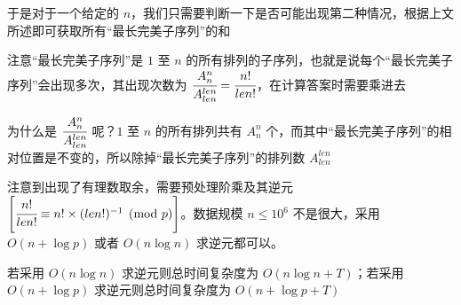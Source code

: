 \documentclass{pptt}
\begin{document}
\begin{frame}
    于是对于一个给定的 $n$，我们只需要判断一下是否可能出现第二种情况，根据上文所述即可获取所有“最长完美子序列”的和

    注意“最长完美子序列”是 $1$ 至 $n$ 的所有排列的子序列，也就是说每个“最长完美子序列”会出现多次，其出现次数为 $\cfrac{A_n^n}{A_{len}^{len}}=\cfrac{n!}{len!}$，在计算答案时需要乘进去

    为什么是 $\cfrac{A_n^n}{A_{len}^{len}}$ 呢？$1$ 至 $n$ 的所有排列共有 $A_n^n$ 个，而其中“最长完美子序列”的相对位置是不变的，所以除掉“最长完美子序列”的排列数 $A_{len}^{len}$

    注意到出现了有理数取余，需要预处理阶乘及其逆元 $\left[ \cfrac{n!}{len!} \equiv n! \times (len!)^{-1}\pmod p \right]$。数据规模 $n \leq {10}^6$ 不是很大，采用 $O(n+\log{p})$ 或者 $O(n\log{n})$ 求逆元都可以。
    
    若采用 $O(n\log{n})$ 求逆元则总时间复杂度为 $O(n\log{n}+T)$；若采用 $O(n+\log{p})$ 求逆元则总时间复杂度为 $O(n+\log{p}+T)$
\end{frame}
\end{document}
